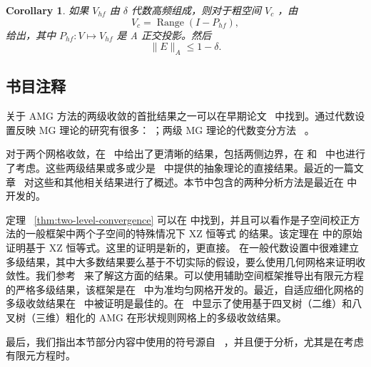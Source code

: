 \documentclass[12pt]{acta_2011xz}
\newtheorem{corollary}[theorem]{Corollary}
\begin{document}
   \begin{corollary}   \label{c:AHF}    如果    $V_{hf}$    由    $\delta$    代数高频组成，则对于粗空间    $V_c$   ，由
   \begin{equation}
  \label{quasiVc} V_c= \operatorname{Range}(I-P_{hf}),
\end{equation}    给出，其中    $P_{hf}: V\mapsto V_{hf}$    是 A 正交投影。然后
   $$
\|E\|_A\le 1-\delta .
$$     \end{corollary}     

   \subsection{书目注释  }    关于 AMG 方法的两级收敛的首批结果之一可以在早期论文~    \cite{1stAMG,Ruge.J;Stuben.K.1987a}    中找到。通过代数设置反映 MG 理论的研究有很多：
   \cite{1983MaitreJ_MusyF-aa,1985BankR_DouglasC-aa,Mandel.J.1988a}   ；两级 MG 理论的代数变分方法~    \cite{1985McCormickS-aa,1984McCormickS-aa,1982McCormickS_RugeJ-aa}   。  

对于两个网格收敛，在~    \cite{2008ZikatanovL-aa}    中给出了更清晰的结果，包括两侧边界，在
   \cite{Falgout.R;Vassilevski.P.2004a}    和~    \cite{Falgout.R;Vasilevski.P;Zikatanov.L.2005a}    中也进行了考虑。这些两级结果或多或少是~    \cite{1991BrambleJ_PasciakJ_WangJ_XuJ-ac,1992XuJ-aa,Xu.J;Zikatanov.L.2002a}    中提供的抽象理论的直接结果。最近的一篇文章~    \cite{2014MacLachlanS_OlsonL-aa}    对这些和其他相关结果进行了概述。本节中包含的两种分析方法是最近在
   \cite{UnifiedAMG,EnergyMin}    中开发的。  

定理~    \ref{thm:two-level-convergence}    可以在
   \cite{2008ZikatanovL-aa}    中找到，并且可以看作是子空间校正方法的一般框架中两个子空间的特殊情况下 XZ 恒等式
   \cite{Xu.J;Zikatanov.L.2002a}    的结果。该定理在    \cite{2008ZikatanovL-aa}    中的原始证明基于 XZ 恒等式。这里的证明是新的，更直接。
在一般代数设置中很难建立多级结果，其中大多数结果要么基于不切实际的假设，要么使用几何网格来证明收敛性。我们参考~    \cite{1996VanekP_MandelJ_BrezinaM-aa,2011BrezinaM_VassilevskiP-aa}    来了解这方面的结果。可以使用辅助空间框架推导出有限元方程的严格多级结果，该框架是在~    \cite{1996XuJ-aa}    中为准均匀网格开发的。最近，自适应细化网格的多级收敛结果在~    \cite{2012ChenL_NochettoR_XuJ-aa}    中被证明是最佳的。在~   \cite{2015GrasedyckL_WangL_XuJ-aa}    中显示了使用基于四叉树（二维）和八叉树（三维）粗化的 AMG 在形状规则网格上的多级收敛结果。  

最后，我们指出本节部分内容中使用的符号源自~   \cite{1980BankR_DupontT-aa,bramble1987new,bramble1990parallel}   ，并且便于分析，尤其是在考虑有限元方程时。  
\end{document}
